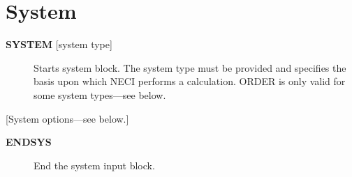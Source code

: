 \documentclass[openany,a4paper,10pt]{manual}
\begin{document}
\resetcurrentobjects


\hypertarget{input-system}{}\section{System}
\begin{description}
\item[\textbf{SYSTEM} {[}system type{]}]
Starts system block.  The system type must be provided and specifies
the basis upon which NECI performs a calculation.  ORDER is only valid
for some system types---see below.

\end{description}

{[}System options---see below.{]}
\begin{description}
\item[\textbf{ENDSYS}]
End the system input block.

\end{description}
\end{document}
